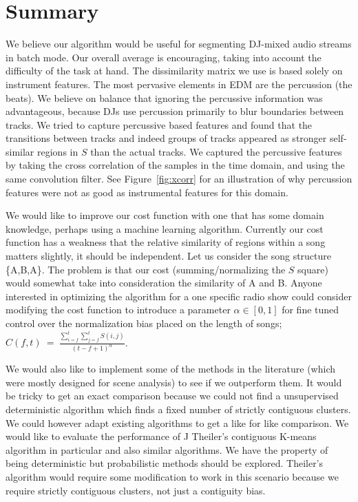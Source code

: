 \documentclass[twocolumn]{article}
\begin{document}
\section{Summary}\label{conclusions}

We believe our algorithm would be useful for segmenting DJ-mixed audio streams in batch mode. Our overall average is encouraging, taking into account the difficulty of the task at hand. The dissimilarity matrix we use is based solely on instrument features. The most pervasive elements in EDM are the percussion (the beats). We believe on balance that ignoring the percussive information was advantageous, because DJs use percussion primarily to blur boundaries between tracks.  We tried to capture percussive based features and found that the transitions between tracks and indeed groups of tracks appeared as stronger self-similar regions in $S$ than the actual tracks. We captured the percussive features by taking the cross correlation of the samples in the time domain, and using the same convolution filter. See Figure~\ref{fig:xcorr} for an illustration of why percussion features were not as good as instrumental features for this domain.

We would like to improve our cost function with one that has some domain knowledge, perhaps using a machine learning algorithm. Currently our cost function has a weakness that the relative similarity of regions within a song matters slightly, it should be independent. Let us consider the song structure \{A,B,A\}. The problem is that our cost (summing/normalizing the $S$ square) would somewhat take into consideration the similarity of A and B. Anyone interested in optimizing the algorithm for a one specific radio show could consider modifying the cost function to introduce a parameter $\alpha \in [0,1]$ for fine tuned control over the normalization bias placed on the length of songs; $C(f,t) ~=~ \frac{ \sum_{i=f}^{t} \sum_{j=f}^{t} S(i,j) }{ (t-f+1)^\alpha }$. 

 We would also like to implement some of the methods in the literature (which were mostly designed for scene analysis) to see if we outperform them. It would be tricky to get an exact comparison because we could not find a unsupervised deterministic algorithm which finds a fixed number of strictly contiguous clusters. We could however adapt existing algorithms to get a like for like comparison. We would like to evaluate the performance of J Theiler's contiguous K-means algorithm in particular \cite{theiler1997contiguity} and also similar algorithms. We have the property of being deterministic but probabilistic methods should be explored. Theiler's algorithm would require some modification to work in this scenario because we require strictly contiguous clusters, not just a contiguity bias. 









\end{document}

